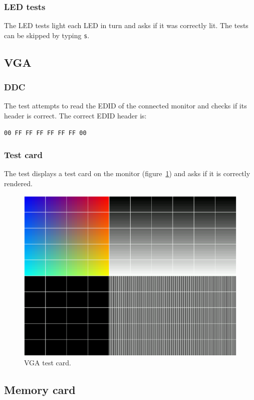 \documentclass[a4paper,11pt]{article}
\begin{document}
\subsubsection{LED tests}
The LED tests light each LED in turn and asks if it was correctly lit. The tests can be skipped by typing \verb!s!.

\subsection{VGA}
\subsubsection{DDC}
The test attempts to read the EDID of the connected monitor and checks if its header is correct. The correct EDID header is:
\begin{verbatim}
00 FF FF FF FF FF FF 00
\end{verbatim}

\subsubsection{Test card}
The test displays a test card on the monitor (figure~\ref{testcard}) and asks if it is correctly rendered.

\begin{figure}
\centering
\includegraphics[width=\textwidth]{testcard.eps}
\caption{VGA test card.} \label{testcard}
\end{figure}

\subsection{Memory card}
\end{document}
